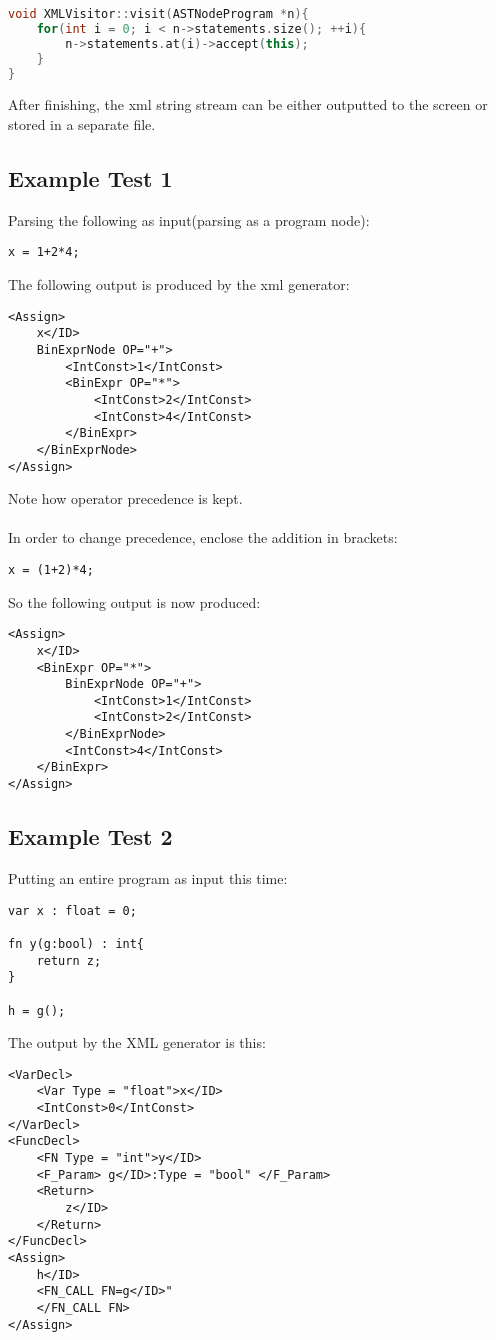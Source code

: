 \begin{lstlisting}[language=C++]
void XMLVisitor::visit(ASTNodeProgram *n){
	for(int i = 0; i < n->statements.size(); ++i){
		n->statements.at(i)->accept(this);
	}
}
\end{lstlisting}

After finishing, the xml string stream can be either outputted to the screen or stored in a separate file.

\subsection{Example Test 1}
Parsing the following as input(parsing as a program node):
\begin{lstlisting}
x = 1+2*4;
\end{lstlisting}

The following output is produced by the xml generator:
\begin{lstlisting}
<Assign>
	x</ID>
	BinExprNode OP="+">
		<IntConst>1</IntConst>
		<BinExpr OP="*">
			<IntConst>2</IntConst>
			<IntConst>4</IntConst>
		</BinExpr>
	</BinExprNode>
</Assign>
\end{lstlisting}
Note how operator precedence is kept.
\\\\
In order to change precedence, enclose the addition in brackets:
\begin{lstlisting}
x = (1+2)*4;
\end{lstlisting}

So the following output is now produced:
\begin{lstlisting}
<Assign>
	x</ID>
	<BinExpr OP="*">
		BinExprNode OP="+">
			<IntConst>1</IntConst>
			<IntConst>2</IntConst>
		</BinExprNode>
		<IntConst>4</IntConst>
	</BinExpr>
</Assign>
\end{lstlisting}

\subsection{Example Test 2}
Putting an entire program as input this time:
\begin{lstlisting}
var x : float = 0;

fn y(g:bool) : int{
	return z;
}

h = g();
\end{lstlisting}

The output by the XML generator is this:
\begin{lstlisting}
<VarDecl>
	<Var Type = "float">x</ID>
	<IntConst>0</IntConst>
</VarDecl>
<FuncDecl>
	<FN Type = "int">y</ID>
	<F_Param> g</ID>:Type = "bool" </F_Param>
	<Return>
		z</ID>
	</Return>
</FuncDecl>
<Assign>
	h</ID>
	<FN_CALL FN=g</ID>"
	</FN_CALL FN>
</Assign>
\end{lstlisting}